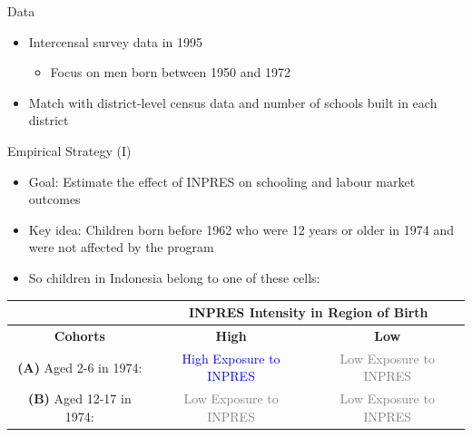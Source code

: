 \documentclass[11pt,notes=hide,aspectratio=169,mathserif]{beamer}
\begin{document}
\begin{frame}{Data}
\begin{itemize}
\item Intercensal survey data in 1995 
\begin{itemize}
     \item Focus on men born between 1950 and 1972
\end{itemize}   
 \item Match with district-level census data and number of schools built in each district
\end{itemize}
\end{frame}

\begin{frame}{Empirical Strategy (I)}
\begin{itemize}
\item Goal: Estimate the effect of INPRES on schooling and labour market outcomes
 \item  Key idea: Children born before 1962 who were 12 years or older in 1974 and were not affected by the program
 \item  So children in Indonesia belong to one of these cells:
\end{itemize}
{
\begin{table}
\scriptsize
\centering
\begin{tabular}{|c|c|c|}
\hline
    & \multicolumn{2}{|c|}{\textbf{INPRES Intensity in Region of Birth}}  \\
    \hline
    \textbf{Cohorts} & \textbf{High} & \textbf{Low}  \\
\hline 
\textbf{(A)} Aged 2-6 in 1974:  & \rule{0pt}{15pt}  \textcolor{blue}{High Exposure to INPRES} & \rule{0pt}{15pt} \textcolor{gray}{Low Exposure to INPRES} \\
\hline
\textbf{(B)} Aged 12-17 in 1974:  & \rule{0pt}{15pt} \textcolor{gray}{Low Exposure to INPRES} & \rule{0pt}{15pt} \textcolor{gray}{Low Exposure to INPRES} \\
\hline
\end{tabular}
\end{table}
}
\end{frame}
\end{document}

